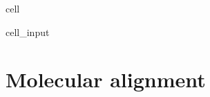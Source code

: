\documentclass[letterpaper,table,10pt,english]{jupyterBook}
\begin{document}
\begin{sphinxuseclass}{cell}\begin{sphinxVerbatimInput}

\begin{sphinxuseclass}{cell_input}
\begin{sphinxVerbatim}[commandchars=\\\{\}]

      

\end{sphinxVerbatim}

\end{sphinxuseclass}\end{sphinxVerbatimInput}

\end{sphinxuseclass}
\sphinxstepscope


\section{Molecular alignment}
\label{\detokenize{part1/theory_molecular_alignment_170723:molecular-alignment}}\label{\detokenize{part1/theory_molecular_alignment_170723:sect-theory-alignment}}\label{\detokenize{part1/theory_molecular_alignment_170723::doc}}
\end{document}
